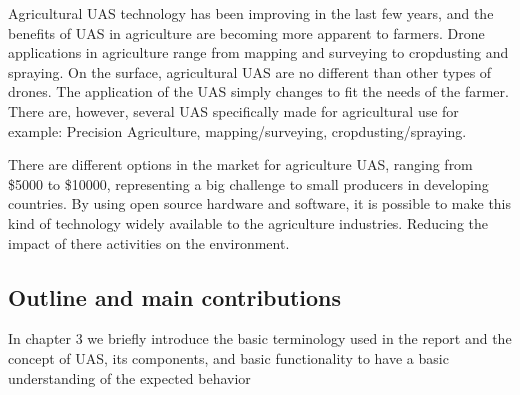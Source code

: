 
Agricultural UAS technology has been improving in the last few years, and the benefits of UAS in agriculture are becoming more apparent to farmers. Drone applications in agriculture range from mapping and surveying to cropdusting and spraying. On the surface, agricultural UAS are no different than other types of drones. The application of the UAS simply changes to fit the needs of the farmer. There are, however, several UAS specifically made for agricultural use for example: Precision Agriculture, mapping/surveying, cropdusting/spraying. 

There are different options in the market for agriculture UAS, ranging from \$5000 to \$10000, representing a big challenge to small producers in developing countries. By using open source hardware and software, it is possible to make this kind of technology widely available to the agriculture industries. Reducing  the impact of there activities on the environment.

\subsection{Outline and main contributions}
In chapter 3 we briefly introduce the basic terminology used in the report and the concept of UAS, its components, and basic functionality to have a basic understanding of the expected behavior  